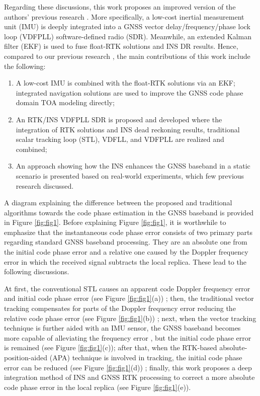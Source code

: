 \documentclass{article}
\newcommand{\reffig}[1]{Figure \ref{#1}}
\begin{document}
Regarding these discussions, this work proposes an improved version of the authors' previous research \cite{Luo2022aa,Luo2021apa}. More specifically, a low-cost inertial measurement unit (IMU) is deeply integrated into a GNSS vector delay/frequency/phase lock loop (VDFPLL) software-defined radio (SDR). Meanwhile, an extended Kalman filter (EKF) is used to fuse float-RTK solutions and INS DR results. Hence, compared to our previous research \cite{Luo2022aa}, the main contributions of this work include the following:
\begin{enumerate}
\item  A low-cost IMU is combined with the float-RTK solutions via an EKF; integrated navigation solutions are used to improve the GNSS code phase domain TOA modeling directly; 
\item  An RTK/INS VDFPLL SDR is proposed and developed where the integration of RTK solutions and INS dead reckoning results, traditional scalar tracking loop (STL), VDFLL, and VDFPLL are realized and combined; 
\item  An approach showing how the INS enhances the GNSS baseband in a static scenario is presented based on real-world experiments, which few previous research discussed. 
\end{enumerate}

A diagram explaining the difference between the proposed and traditional algorithms towards the code phase estimation in the GNSS baseband is provided in \reffig{fig:fig1}. Before explaining \reffig{fig:fig1}, it is worthwhile to emphasize that the instantaneous code phase error consists of two primary parts regarding standard GNSS baseband processing. They are an absolute one from the initial code phase error and a relative one caused by the Doppler frequency error in which the received signal subtracts the local replica. These lead to the following discussions.

At first, the conventional STL causes an apparent code Doppler frequency error and initial code phase error (see \reffig{fig:fig1}(a)) \cite{Kaplan2017}; then, the traditional vector tracking compensates for parts of the Doppler frequency error reducing the relative code phase error  (see \reffig{fig:fig1}(b)) \cite{Parkinson1996,Lashley2021}; next, when the vector tracking technique is further aided with an IMU sensor, the GNSS baseband becomes more capable of alleviating the frequency error \cite{Lashley2013a}, but the initial code phase error is remained (see \reffig{fig:fig1}(c)); after that, when the RTK-based absolute-position-aided (APA) technique is involved in tracking, the initial code phase error can be reduced (see \reffig{fig:fig1}(d)) \cite{Luo2022aa}; finally, this work proposes a deep integration method of INS and GNSS RTK processing to correct a more absolute code phase error in the local replica (see \reffig{fig:fig1}(e)). 
\end{document}
